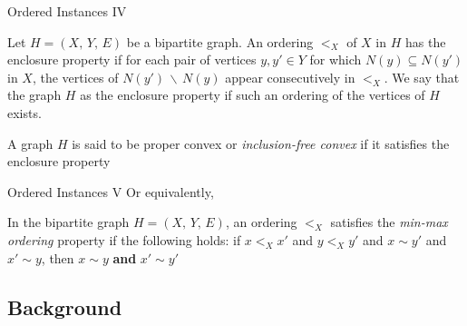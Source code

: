 \documentclass[10pt]{beamer}
\begin{document}
\begin{frame}{Ordered Instances IV}
	\begin{definition}
Let $H = (X, \, Y, \, E)$ be a bipartite graph. An ordering $<_X$ of $X$ in $H$ has the enclosure property if for each pair of vertices $y, y' \in Y$ for which $N(y) \subseteq N(y')$ in $X$, the vertices of $N(y') \, \backslash \, N(y)$ appear consecutively in $<_X$. We say that the graph $H$ as the enclosure property if such an ordering of the vertices of $H$ exists.	
	\end{definition}
    A graph $H$ is said to be \alert{proper convex} or \emph{inclusion-free convex} if it satisfies the enclosure property
\end{frame}

\begin{frame}{Ordered Instances V}
    Or equivalently, 
    \begin{definition}
    	In the bipartite graph $H = (X, \, Y, \, E)$, an ordering $<_X$ satisfies the \emph{min-max ordering} property if the following holds: if $x <_X x'$ and $y <_X y'$ and $x \sim y'$ and $x' \sim y$, then \alert{$x \sim y$} \textbf{and} \alert{$x' \sim y'$}
    	\begin{figure}
		\end{figure}
    \end{definition}
\end{frame}

\subsection{Background}
\end{document}
